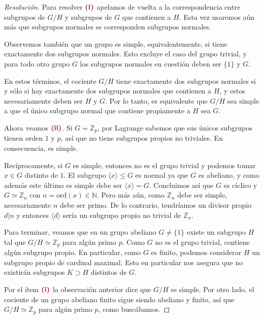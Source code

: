 \documentclass[11pt]{article}
\theoremstyle{colored}
\newcommand{\N}{\mathbb{N}}
\newcommand{\Z}{\mathbb{Z}}
\newcommand{\paint}[1]{\color{color}{#1}}
\newcommand{\tpaint}[1]{\paint{\textbf{#1}}}
\begin{document}
\begin{proof}[Resolución] Para resolver $\tpaint{(i)}$ apelamos de vuelta a la correspondencia entre subgrupos de $G/H$ y subgrupos de $G$ que contienen a $H$. Esta vez usaremos aún más que subgrupos normales se corresponden subgrupos normales. 

Observemos también que un grupo es simple, equivalentemente, si tiene exactamente dos subgrupos normales. Esto excluye el caso del grupo trivial, y para todo otro grupo $G$ los subgrupos normales en cuestión deben ser $\{1\}$ y $G$.

En estos términos, el cociente $G/H$ tiene exactamente dos subgrupos normales si y sólo si hay exactamente dos subgrupos normales que contienen a $H$, y estos necesariamente deben ser $H$ y $G$. Por lo tanto, es equivalente que $G/H$ sea simple a que el único subgrupo normal que contiene propiamente a $H$ sea $G$.

Ahora veamos $\tpaint{(ii)}$. Si $G = \Z_p$, por Lagrange sabemos que sus únicos subgrupos tienen orden $1$ y $p$, así que no tiene subgrupos propios no triviales. En consecuencia, es simple. 

Recíprocamente, si $G$ es simple, entonces no es el grupo trivial y podemos tomar $x \in G$ distinto de $1$. El subgrupo $\langle x \rangle \leq G$ es normal ya que $G$ es abeliano, y como además este último es simple debe ser $\langle x \rangle = G$. Concluimos así que $G$ es cíclico y $G \simeq \Z_n$ con $n = \mathrm{ord}(x) \in \N$. Pero más aún, como $\Z_n$ debe ser simple, necesariamente $n$ debe ser primo. De lo contrario, tendríamos un divisor propio $d | n$ y entonces $\langle d \rangle$ sería un subgrupo propio no trivial de $\Z_n$.

Para terminar, veamos que en un grupo abeliano $G \neq \{1\}$ existe un subgrupo $H$ tal que $G/H \simeq \Z_p$ para algún primo $p$. Como $G$ no es el grupo trivial, contiene algún subgrupo propio. En particular, como $G$ es finito, podemos considerar $H$ un subgrupo propio de cardinal maximal. Esto en particular nos asegura que no existirán subgrupos $K \supset H$ distintos de $G$. 

Por el ítem $\tpaint{(i)}$ la observación anterior dice que $G/H$ es simple. Por otro lado, el cociente de un grupo abeliano finito sigue siendo abeliano y finito, así que $G/H \simeq \Z_p$ para algún primo $p$, como buscábamos.
\end{proof}
\end{document}
